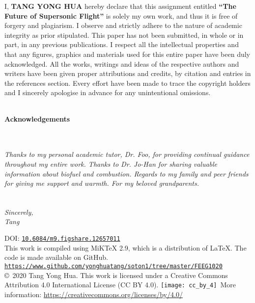 \documentclass[a4paper,11pt]{article}
\begin{document}
\noindent I, \textbf{TANG YONG HUA} hereby declare that this assignment entitled \textbf{``The Future of Supersonic Flight''} is solely my own work, and thus it is free of forgery and plagiarism. I observe and strictly adhere to the nature of academic integrity as prior stipulated. This paper has not been submitted, in whole or in part, in any previous publications. I respect all the intellectual properties and that any figures, graphics and materials used for this entire paper have been duly acknowledged. All the works, writings and ideas of the respective authors and writers have been given proper attributions and credits, by citation and entries in the references section. Every effort have been made to trace the copyright holders and I sincerely apologise in advance for any unintentional omissions.\\ \\


\vspace{5cm}


\noindent\begin{Large}\textbf{Acknowledgements}\end{Large}\\ \\

\noindent \textit{Thanks to my personal academic tutor, Dr. Foo, for providing continual guidance throughout my entire work. Thanks to Dr. Jo-Han for sharing valuable information about biofuel and combustion. Regards to my family and peer friends for giving me support and warmth. For my beloved grandparents.\\ \\ \\Sincerely,\\Tang}

\vspace*{\fill}

\noindent \begin{small}DOI: \href{https://www.doi.org/10.6084/m9.figshare.12657011}{\texttt{10.6084/m9.figshare.12657011}}\\ This work is compiled using MiKTeX 2.9, which is a distribution of \LaTeX. The code is made available on GitHub. \href{https://www.github.com/yonghuatang/soton1/tree/master/FEEG1020}{\texttt{https://www.github.com/yonghuatang/soton1/tree/master/FEEG1020}}\\ \copyright \ 2020 Tang Yong Hua.  This work is licensed under a Creative Commons Attribution 4.0 International License (CC BY 4.0). \texttt{[image: cc\_by\_4]}\ More information: \url{https://creativecommons.org/licenses/by/4.0/}\end{small}
\end{document}
